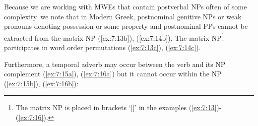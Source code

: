 \documentclass[output=paper]{langsci/langscibook}
\begin{document}
Because we are working with MWEs that contain postverbal NPs \textendash often of some complexity\textendash ~we note that in Modern Greek, postnominal genitive NPs or weak pronouns denoting possession or some property and postnominal PPs cannot be extracted from the matrix NP (\ref{ex:7:13b}), (\ref{ex:7:14b}). The matrix NP\footnote{The matrix NP is placed in brackets `[]' in the examples (\ref{ex:7:13})-(\ref{ex:7:16}).} participates in word order permutations (\ref{ex:7:13c}), (\ref{ex:7:14c}). 

\begin{exe}
\ex \label{ex:7:13}
\begin{xlist}
\end{xlist}
\end{exe}

\begin{exe}
\ex \label{ex:7:14}
\begin{xlist}
\end{xlist}
\end{exe}

Furthermore, a temporal adverb may occur between the verb and its NP complement (\ref{ex:7:15a}), (\ref{ex:7:16a}) but it cannot occur within the NP (\ref{ex:7:15b}), (\ref{ex:7:16b}):
\end{document}
